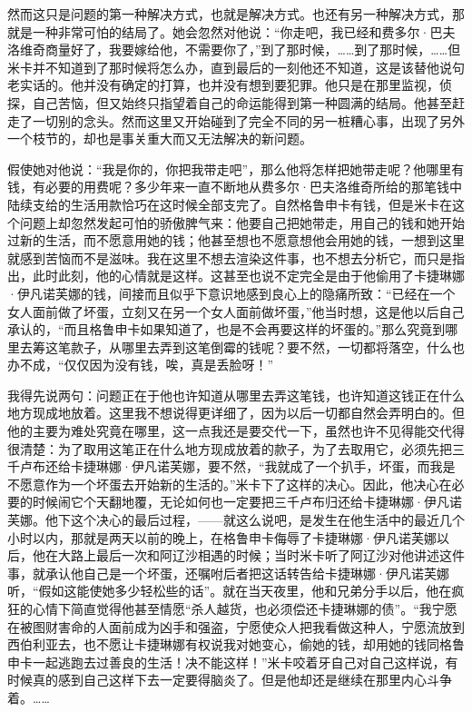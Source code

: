 \par 然而这只是问题的第一种解决方式，也就是解决方式。也还有另一种解决方式，那就是一种非常可怕的结局了。她会忽然对他说：“你走吧，我已经和费多尔·巴夫洛维奇商量好了，我要嫁给他，不需要你了，”到了那时候，……到了那时候，……但米卡并不知道到了那时候将怎么办，直到最后的一刻他还不知道，这是该替他说句老实话的。他并没有确定的打算，也并没有想到要犯罪。他只是在那里监视，侦探，自己苦恼，但又始终只指望着自己的命运能得到第一种圆满的结局。他甚至赶走了一切别的念头。然而这里又开始碰到了完全不同的另一桩糟心事，出现了另外一个枝节的，却也是事关重大而又无法解决的新问题。
\par 假使她对他说：“我是你的，你把我带走吧”，那么他将怎样把她带走呢？他哪里有钱，有必要的用费呢？多少年来一直不断地从费多尔·巴夫洛维奇所给的那笔钱中陆续支给的生活用款恰巧在这时候全部支完了。自然格鲁申卡有钱，但是米卡在这个问题上却忽然发起可怕的骄傲脾气来：他要自己把她带走，用自己的钱和她开始过新的生活，而不愿意用她的钱；他甚至想也不愿意想他会用她的钱，一想到这里就感到苦恼而不是滋味。我在这里不想去渲染这件事，也不想去分析它，而只是指出，此时此刻，他的心情就是这样。这甚至也说不定完全是由于他偷用了卡捷琳娜·伊凡诺芙娜的钱，间接而且似乎下意识地感到良心上的隐痛所致：“已经在一个女人面前做了坏蛋，立刻又在另一个女人面前做坏蛋，”他当时想，这是他以后自己承认的，“而且格鲁申卡如果知道了，也是不会再要这样的坏蛋的。”那么究竟到哪里去筹这笔款子，从哪里去弄到这笔倒霉的钱呢？要不然，一切都将落空，什么也办不成，“仅仅因为没有钱，唉，真是丢脸呀！”
\par 我得先说两句：问题正在于他也许知道从哪里去弄这笔钱，也许知道这钱正在什么地方现成地放着。这里我不想说得更详细了，因为以后一切都自然会弄明白的。但他的主要为难处究竟在哪里，这一点我还是要交代一下，虽然也许不见得能交代得很清楚：为了取用这笔正在什么地方现成放着的款子，为了去取用它，必须先把三千卢布还给卡捷琳娜·伊凡诺芙娜，要不然，“我就成了一个扒手，坏蛋，而我是不愿意作为一个坏蛋去开始新的生活的。”米卡下了这样的决心。因此，他决心在必要的时候闹它个天翻地覆，无论如何也一定要把三千卢布归还给卡捷琳娜·伊凡诺芙娜。他下这个决心的最后过程，——就这么说吧，是发生在他生活中的最近几个小时以内，那就是两天以前的晚上，在格鲁申卡侮辱了卡捷琳娜·伊凡诺芙娜以后，他在大路上最后一次和阿辽沙相遇的时候；当时米卡听了阿辽沙对他讲述这件事，就承认他自己是一个坏蛋，还嘱咐后者把这话转告给卡捷琳娜·伊凡诺芙娜听，“假如这能使她多少轻松些的话”。就在当天夜里，他和兄弟分手以后，他在疯狂的心情下简直觉得他甚至情愿“杀人越货，也必须偿还卡捷琳娜的债”。“我宁愿在被图财害命的人面前成为凶手和强盗，宁愿使众人把我看做这种人，宁愿流放到西伯利亚去，也不愿让卡捷琳娜有权说我对她变心，偷她的钱，却用她的钱同格鲁申卡一起逃跑去过善良的生活！决不能这样！”米卡咬着牙自己对自己这样说，有时候真的感到自己这样下去一定要得脑炎了。但是他却还是继续在那里内心斗争着。……
